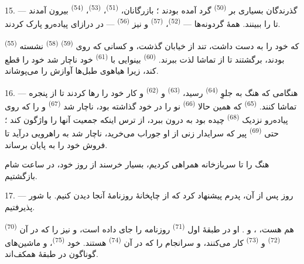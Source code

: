 15. --- گذرندگان بسیاری بر  \textsuperscript{(50)} گرد
آمده بودند ؛ بازرگانان،  \textsuperscript{(51)}،
 \textsuperscript{(53)}، 
\textsuperscript{(54)} بیرون آمدند تا  را ببینند. همهٔ
گردونه‌ها —  \textsuperscript{(52)}،  \textsuperscript{(57)} و نیز 
\textsuperscript{(56)} — در درازای پیاده‌رو پارک کردند.

\VUsaut{3.0mm}

 \textsuperscript{(55)} که  خود را به دست داشت، تند از خیابان گذشت، و کسانی که روی
 \textsuperscript{(59)} 
\textsuperscript{(58)} نشسته بودند، برگشتند تا از تماشا لذت ببرند.
 \textsuperscript{(60)} بینوایی با
 \textsuperscript{(61)} خود ناچار شد 
خود را قطع کند، زیرا هیاهوی طبل‌ها آوازش را می‌پوشاند.

16. --- هنگامی که هنگ به جلوِ 
\textsuperscript{(64)} رسید،  \textsuperscript{(63)}
و  \textsuperscript{(62)}  و کار
خود را رها کردند تا از پنجره تماشا کنند. 
\textsuperscript{(65)} که همین حالا 
\textsuperscript{(66)} نو را در  خود گذاشته بود، ناچار
شد  \textsuperscript{(67)} و  را که
روی پیاده‌رو نزدیک  \textsuperscript{(68)} چیده
بود به درون ببرد، از ترس اینکه جمعیت آنها را واژگون کند ؛ حتی
 \textsuperscript{(69)} پیر که سرایدار زنی از او جوراب
می‌خرید، ناچار شد به راهرویی درآید تا فروش خود را به پایان برساند.

هنگ را تا سربازخانه همراهی کردیم،  بسیار خرسند از روز خود،
در ساعت شام بازگشتیم.

\VUsaut{3.0mm}

17. --- روز پس از آن، پدرم پیشنهاد کرد که از چاپخانهٔ روزنامهٔ آنجا
دیدن کنیم. با شور پذیرفتیم.

  \textsuperscript{(70)} هم هست،
،  و . او در طبقهٔ اول
 \textsuperscript{(71)} روزنامه را جای داده است، و نیز
 را که در آن 
\textsuperscript{(72)} و  \textsuperscript{(73)} کار
می‌کنند، و سرانجام  را که در آن
 \textsuperscript{(74)} هستند. خود
 \textsuperscript{(75)}،  و
ماشین‌های گوناگون در طبقهٔ همکف‌اند.

